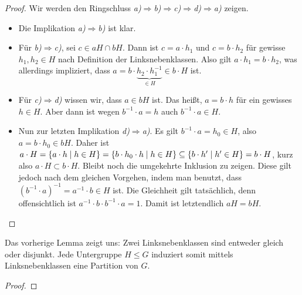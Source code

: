 {\begin{proof}
  Wir werden den Ringschluss \emph{a)}$\Rightarrow$\emph{b)}$\Rightarrow$\emph{c)}$\Rightarrow$\emph{d)}$\Rightarrow$\emph{a)} zeigen.
  \begin{itemize}
    \item Die Implikation \emph{a)}$\Rightarrow$\emph{b)} ist klar.
    \item Für \emph{b)}$\Rightarrow$\emph{c)}, sei $c \in aH \cap bH$. Dann ist $c = a\cdot h_1$ und $c = b\cdot h_2$ für gewisse $h_1,h_2 \in H$ nach Definition der Linksnebenklassen. Also gilt $a\cdot h_1 = b\cdot h_2$, was allerdings impliziert, dass $a= b\cdot \underbrace{h_2\cdot h_1^{-1}}_{\in H} \in b \cdot H$ ist.
    \item Für \emph{c)}$\Rightarrow$\emph{d)} wissen wir, dass $a \in bH$ ist. Das heißt, $a = b\cdot h$ für ein gewisses $h \in H$. Aber dann ist wegen $b^{-1}\cdot a = h$ auch $b^{-1}\cdot a \in H$.
    \item Nun zur letzten Implikation \emph{d)}$\Rightarrow$\emph{a)}. Es gilt $b^{-1}\cdot a = h_0 \in H$, also $a=b\cdot h_0 \in bH$. Daher ist $a\cdot H = \left\{ a\cdot h \suchthat h \in H \right\} = \left\{ b\cdot h_0 \cdot h \suchthat h \in H \right\} \subseteq \left\{ b\cdot h' \suchthat h' \in H \right\} = b \cdot H$, kurz also $a\cdot H \subset b \cdot H$.
    Bleibt noch die umgekehrte Inklusion zu zeigen. Diese gilt jedoch nach dem gleichen Vorgehen, indem man benutzt, dass $(b^{-1}\cdot a)^{-1} = a^{-1} \cdot b \in H$ ist. Die Gleichheit gilt tatsächlich, denn offensichtlich ist $a^{-1}\cdot b \cdot b^{-1} \cdot a = 1$.
    Damit ist letztendlich $aH = bH$.
  \end{itemize}
\end{proof}

Das vorherige Lemma zeigt uns: Zwei Linksnebenklassen sind entweder gleich oder disjunkt. Jede Untergruppe $H \leq G$ induziert somit mittels Linksnebenklassen eine Partition von $G$.

\begin{theorem}

\end{theorem}

\begin{proof}

\end{proof}

\begin{remark}

\end{remark}}
